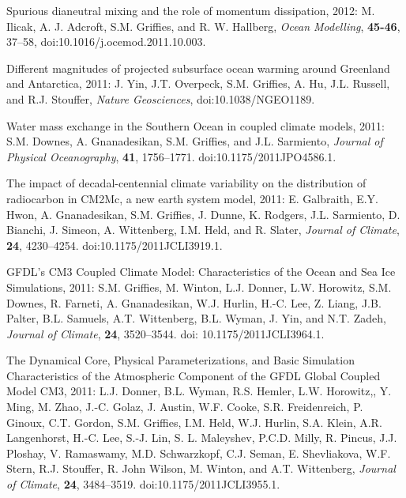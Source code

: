 \begin{etaremune}
\item Spurious dianeutral mixing and the role of momentum dissipation, 2012: M. Ilicak, A. J. Adcroft, S.M. Grif\/f\/ies, and
  R. W. Hallberg, {\it Ocean Modelling}, {\bf 45-46}, 37--58,
  doi:10.1016/j.ocemod.2011.10.003.

\item Different magnitudes of projected subsurface ocean warming
  around Greenland and Antarctica, 2011: J. Yin, J.T. Overpeck, S.M. Grif\/f\/ies, A. Hu, J.L. Russell, and R.J. Stouffer, {\it
    Nature Geosciences}, doi:10.1038/NGEO1189.

\item Water mass exchange in the Southern Ocean in coupled climate
  models, 2011: S.M. Downes, A. Gnanadesikan, S.M. Grif\/f\/ies,
  and J.L. Sarmiento, {\it Journal of Physical Oceanography}, {\bf
    41}, 1756--1771.  doi:10.1175/2011JPO4586.1.

\item The impact of decadal-centennial climate variability on the
  distribution of radiocarbon in CM2Mc, a new earth system model,
  2011: E. Galbraith, E.Y. Hwon, A. Gnanadesikan, S.M. Grif\/f\/ies, J. Dunne, K. Rodgers, J.L. Sarmiento, D. Bianchi, J. Simeon, A. Wittenberg, I.M. Held, and R.  Slater, {\it Journal of Climate}, {\bf 24}, 4230--4254. doi:10.1175/2011JCLI3919.1.

\item GFDL's CM3 Coupled Climate Model: Characteristics of the Ocean
  and Sea Ice Simulations, 2011: S.M. Grif\/f\/ies, M. Winton,
  L.J. Donner, L.W. Horowitz, S.M. Downes, R.  Farneti,
  A. Gnanadesikan, W.J. Hurlin, H.-C. Lee, Z. Liang, J.B. Palter,
  B.L. Samuels, A.T. Wittenberg, B.L. Wyman, J.  Yin, and N.T. Zadeh,
  {\it Journal of Climate}, {\bf 24}, 3520--3544.  doi:
  10.1175/2011JCLI3964.1.

\item The Dynamical Core, Physical Parameterizations, and Basic Simulation Characteristics of the Atmospheric Component of the GFDL Global Coupled Model CM3, 2011: L.J. Donner, B.L. Wyman, R.S. Hemler, L.W. Horowitz,, Y. Ming, M. Zhao, J.-C. Golaz, J. Austin, W.F. Cooke, S.R. Freidenreich, P. Ginoux, C.T. Gordon, S.M. Grif\/f\/ies, I.M. Held, W.J. Hurlin, S.A. Klein, A.R. Langenhorst, H.-C. Lee, S.-J. Lin, S. L. Maleyshev, P.C.D. Milly, R. Pincus, J.J. Ploshay, V. Ramaswamy, M.D. Schwarzkopf, C.J. Seman, E. Shevliakova, W.F. Stern, R.J. Stouﬀer, R. John Wilson, M.  Winton, and A.T. Wittenberg, {\it Journal of Climate}, {\bf 24}, 3484--3519. 
  doi:10.1175/2011JCLI3955.1.


\end{etaremune}
